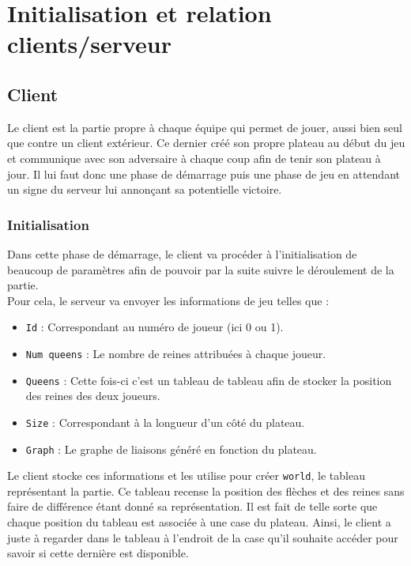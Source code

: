 \chapter{Initialisation et relation clients/serveur}
 
\section{Client}
Le client est la partie propre à chaque équipe qui permet de jouer, aussi bien seul que contre un client extérieur. Ce dernier créé son propre plateau au début du jeu et communique avec son adversaire à chaque coup afin de tenir son plateau à jour. Il lui faut donc une phase de démarrage puis une phase de jeu en attendant un signe du serveur lui annonçant sa potentielle victoire.
\subsection{Initialisation}
Dans cette phase de démarrage, le client va procéder à l'initialisation de beaucoup de paramètres afin de pouvoir par la suite suivre le déroulement de la partie.\\
Pour cela, le serveur va envoyer les informations de jeu telles que :
\begin{itemize}
    \item \texttt{Id} : Correspondant au numéro de joueur (ici 0 ou 1).
    \item \texttt{Num queens} : Le nombre de reines attribuées à chaque joueur.
    \item  \texttt{Queens} : Cette fois-ci c'est un tableau de tableau afin de stocker la position des reines des deux joueurs.
    \item  \texttt{Size} : Correspondant à la longueur d'un côté du plateau.
    \item  \texttt{Graph} : Le graphe de liaisons généré en fonction du plateau.
\end{itemize}

\bigbreak

Le client stocke ces informations et les utilise pour créer \texttt{world}, le tableau représentant la partie. Ce tableau recense la position des flèches et des reines sans faire de différence étant donné sa représentation. Il est fait de telle sorte que chaque position du tableau est associée à une case du plateau. Ainsi, le client a juste à regarder dans le tableau à l'endroit de la case qu'il souhaite accéder pour savoir si cette dernière est disponible. 

